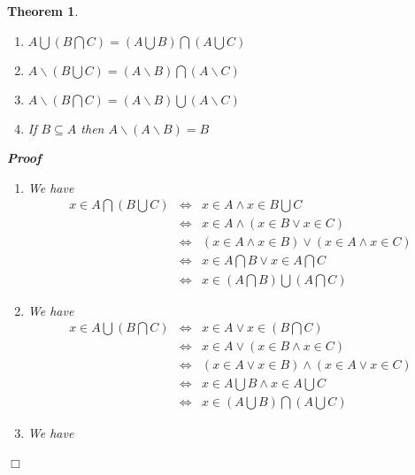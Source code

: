 \documentclass{book}
\newenvironment{proof}{\noindent\textbf{Proof\ }}{\hspace*{\fill}$\Box$\medskip}
\newtheorem{theorem}{Theorem}
\begin{document}
{{\begin{theorem}
\begin{enumerate}
    \item $A \bigcup \left( B \bigcap C \right) = \left( A \bigcup B \right)
    \bigcap \left( A \bigcup C \right)$
    
    \item $A\backslash \left( B \bigcup C \right) = (A\backslash B) \bigcap
    (A\backslash C)$
    
    \item $A\backslash \left( B \bigcap C \right) = (A\backslash B) \bigcup
    (A\backslash C)$
    
    \item If $B \subseteq A$ then $A\backslash (A\backslash B) = B$
  \end{enumerate}
  \begin{proof}
    
    \begin{enumerate}
      \item We have
      \begin{eqnarray*}
        x \in A \bigcap \left( B \bigcup C \right) & \Leftrightarrow & x \in A
        \wedge x \in B \bigcup C\\
        & \Leftrightarrow & x \in A \wedge (x \in B \vee x \in C)\\
        & \Leftrightarrow & (x \in A \wedge x \in B) \vee (x \in A \wedge x
        \in C)\\
        & \Leftrightarrow & x \in A \bigcap B \vee x \in A \bigcap C\\
        & \Leftrightarrow & x \in \left( A \bigcap B \right) \bigcup \left( A
        \bigcap C \right)
      \end{eqnarray*}
      \item We have
      \begin{eqnarray*}
        x \in A \bigcup \left( B \bigcap C \right) & \Leftrightarrow & x \in A
        \vee x \in \left( B \bigcap C \right)\\
        & \Leftrightarrow & x \in A \vee (x \in B \wedge x \in C)\\
        & \Leftrightarrow & (x \in A \vee x \in B) \wedge (x \in A \vee x \in
        C)\\
        & \Leftrightarrow & x \in A \bigcup B \wedge x \in A \bigcup C\\
        & \Leftrightarrow & x \in \left( A \bigcup B \right) \bigcap \left( A
        \bigcup C \right)
      \end{eqnarray*}
      \item We have
      \begin{eqnarray*}

\end{eqnarray*}
\end{enumerate}
\end{proof}
\end{theorem}}}
\end{document}

